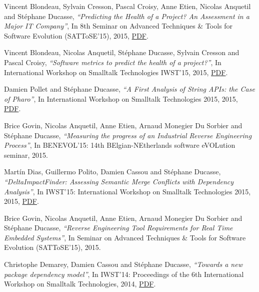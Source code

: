 \documentclass{article}
\newcommand{\czauthors}[1]{#1}
\newcommand{\cztitle}[1]{\emph{``#1''}}
\newcommand{\czbooktitle}[1]{#1}
\begin{document}
\begin{itemize}
	\pub  \czauthors{Vincent Blondeau, Sylvain Cresson, Pascal Croisy, Anne Etien, Nicolas Anquetil and St\'ephane Ducasse},  \cztitle{{Predicting the Health of a Project? An Assessment in a Major IT Company}},  In \czbooktitle{{8th Seminar on Advanced Techniques \& Tools for Software Evolution (SATToSE'15)}}, 2015, \href{http://rmod-files.lille.inria.fr/Team/Texts/Papers/Blon15b-SATToSE-PredictingProjectHealth.pdf}{PDF}.

	\pub  \czauthors{Vincent Blondeau, Nicolas Anquetil, St\'ephane Ducasse, Sylvain Cresson and Pascal Croisy},  \cztitle{Software metrics to predict the health of a project?},  In \czbooktitle{{International Workshop on Smalltalk Technologies IWST'15}}, 2015, \href{http://rmod-files.lille.inria.fr/Team/Texts/Papers/Blon15a-IWST-PredictingProjectHealth.pdf}{PDF}.

	\pub  \czauthors{Damien Pollet and St\'ephane Ducasse},  \cztitle{A First Analysis of String APIs: the Case of Pharo},  In \czbooktitle{International Workshop on Smalltalk Technologies 2015}, 2015, \href{http://rmod-files.lille.inria.fr/Team/Texts/Papers/Poll15a-IWST2015-StringsAPI.pdf}{PDF}.

	\pub  \czauthors{Brice Govin, Nicolas Anquetil, Anne Etien, Arnaud Monegier Du Sorbier and St\'ephane Ducasse},  \cztitle{{Measuring the progress of an Industrial Reverse Engineering Process}},  In \czbooktitle{{BENEVOL'15: 14th BElgian-NEtherlands software
 eVOLution seminar}}, 2015.

	\pub  \czauthors{Mart\'in Dias, Guillermo Polito, Damien Cassou and St\'ephane Ducasse},  \cztitle{DeltaImpactFinder: Assessing Semantic Merge Conflicts with Dependency Analysis},  In \czbooktitle{IWST'15: International Workshop on Smalltalk Technologies 2015}, 2015, \href{http://rmod-files.lille.inria.fr/Team/Texts/Papers/Dias15b-IWST-DeltaImpactFinder.pdf}{PDF}.

	\pub  \czauthors{Brice Govin, Nicolas Anquetil, Anne Etien, Arnaud Monegier Du Sorbier and St\'ephane Ducasse},  \cztitle{{Reverse Engineering Tool Requirements for Real Time Embedded Systems}},  In \czbooktitle{{Seminar on Advanced Techniques \& Tools for Software Evolution (SATToSE'15)}}, 2015.

	\pub  \czauthors{Christophe Demarey, Damien Cassou and St\'ephane Ducasse},  \cztitle{Towards a new package dependency model},  In \czbooktitle{IWST'14: Proceedings of the 6th International Workshop on Smalltalk Technologies}, 2014, \href{http://rmod-files.lille.inria.fr/Team/Texts/Papers/Dema14a-esug2014-dependencies-model.pdf}{PDF}.


\end{itemize}
\end{document}
